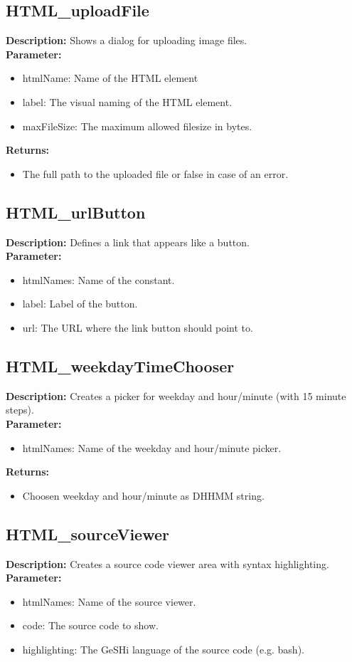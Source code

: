 \subsection{HTML\_uploadFile}
\textbf{Description:} Shows a dialog for uploading image files.\\
\textbf{Parameter:}
\begin{itemize}
\item htmlName: Name of the HTML element
\item label: The visual naming of the HTML element.
\item maxFileSize: The maximum allowed filesize in bytes.
\end{itemize}
\textbf{Returns:}
\begin{itemize}
\item The full path to the uploaded file or false in case of an error.
\end{itemize}

\subsection{HTML\_urlButton}
\textbf{Description:} Defines a link that appears like a button.\\
\textbf{Parameter:}
\begin{itemize}
\item htmlNames: Name of the constant.
\item label: Label of the button.
\item url: The URL where the link button should point to.
\end{itemize}

\subsection{HTML\_weekdayTimeChooser}
\textbf{Description:} Creates a picker for weekday and hour/minute (with 15 minute steps).\\
\textbf{Parameter:}
\begin{itemize}
\item htmlNames: Name of the weekday and hour/minute picker.
\end{itemize}
\textbf{Returns:}
\begin{itemize}
\item Choosen weekday and hour/minute as DHHMM string.
\end{itemize}

\subsection{HTML\_sourceViewer}
\textbf{Description:} Creates a source code viewer area with syntax highlighting.\\
\textbf{Parameter:}
\begin{itemize}
\item htmlNames: Name of the source viewer.
\item code: The source code to show.
\item highlighting: The GeSHi language of the source code (e.g. bash).
\end{itemize}

